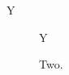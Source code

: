 \documentclass{article}
\begin{document}
\begin{listing}[h]Y\caption{One.}\end{listing}
\begin{figure}[h]Y\caption{Two.}\end{figure}
\end{document}
